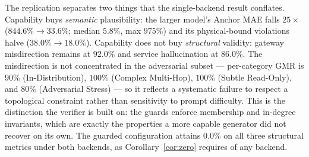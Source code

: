 \documentclass[journal, 10pt]{IEEEtran}
\begin{document}
\begin{table}[!t]
\centering
\caption{Cross-backend replication. Left: lite-tier proprietary model, $3$ repeats. Right: open-weight $117$B model, $1$ repeat (pre-registered; see text). Same $50$ prompts, same harness.}
\label{tab:rq1-backend}
\end{table}

The replication separates two things that the single-backend result conflates.
Capability buys \emph{semantic} plausibility: the larger model's Anchor MAE falls
$25\times$ ($844.6\%\to33.6\%$; median $5.8\%$, max $975\%$) and its physical-bound
violations halve ($38.0\%\to18.0\%$). Capability does not buy \emph{structural}
validity: gateway misdirection remains at $92.0\%$ and service hallucination at
$86.0\%$. The misdirection is not concentrated in the adversarial subset --- per-category
GMR is $90\%$ (In-Distribution), $100\%$ (Complex Multi-Hop), $100\%$ (Subtle
Read-Only), and $80\%$ (Adversarial Stress) --- so it reflects a systematic
failure to respect a topological constraint rather than sensitivity to prompt
difficulty. This is the distinction the verifier is built on: the guards enforce
membership and in-degree invariants, which are exactly the properties a more
capable generator did not recover on its own. The guarded configuration attains
$0.0\%$ on all three structural metrics under both backends, as
Corollary~\ref{cor:zero} requires of any backend.
\end{document}
